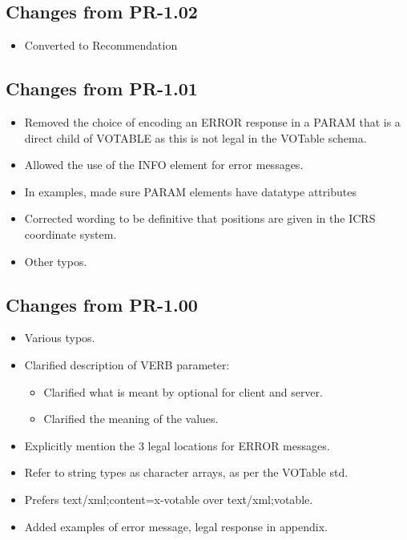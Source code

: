 \documentclass[11pt,a4paper]{ivoa}
\begin{document}
\subsection{Changes from PR-1.02} 
\begin{itemize}[noitemsep] 
\item Converted to Recommendation 
\end{itemize}

\subsection{Changes from PR-1.01} 
\begin{itemize}[noitemsep] 
\item Removed the choice of encoding an ERROR response in a PARAM that is a
direct child of VOTABLE as this is not legal in the VOTable schema.
\item Allowed the use of the INFO element for error messages.  
\item In examples, made sure PARAM elements have datatype attributes 
\item Corrected wording to be definitive that positions are given in the ICRS
coordinate system.  
\item Other typos.  
\end{itemize}

\subsection{Changes from PR-1.00} 
\begin{itemize}[noitemsep] 
\item Various typos.  
\item Clarified description of VERB parameter:
	\begin{itemize}[noitemsep] 
	\item Clarified what is meant by optional for
	client and server.  
	\item Clarified the meaning of the values.
	\end{itemize} 
\item Explicitly mention the 3 legal locations for ERROR
messages.  
\item Refer to string types as character arrays, as per the
VOTable std.  
\item Prefers text/xml;content=x-votable over
text/xml;votable.  
\item Added examples of error message, legal response
in appendix.  
\end{itemize}
\end{document}
